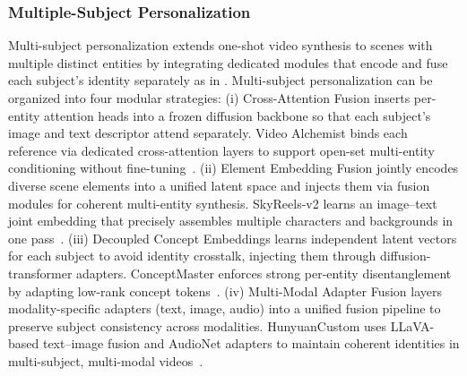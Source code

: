 \subsubsection{Multiple-Subject Personalization}
\label{sec:arch-one-multi}
Multi-subject personalization extends one-shot video synthesis to scenes with multiple distinct entities by integrating dedicated modules that encode and fuse each subject’s identity separately as in \cite{chen2025videoalchemist, chen2025skyreelsv2, huang2025conceptmaster, hu2025hunyuancustom}. Multi-subject personalization can be organized into four modular strategies: (i) Cross-Attention Fusion inserts per-entity attention heads into a frozen diffusion backbone so that each subject’s image and text descriptor attend separately. Video Alchemist binds each reference via dedicated cross-attention layers to support open-set multi-entity conditioning without fine-tuning~\cite{chen2025videoalchemist}. (ii) Element Embedding Fusion jointly encodes diverse scene elements into a unified latent space and injects them via fusion modules for coherent multi-entity synthesis. SkyReels-v2 learns an image–text joint embedding that precisely assembles multiple characters and backgrounds in one pass~\cite{chen2025skyreelsv2}. (iii) Decoupled Concept Embeddings learns independent latent vectors for each subject to avoid identity crosstalk, injecting them through diffusion-transformer adapters. ConceptMaster enforces strong per-entity disentanglement by adapting low-rank concept tokens~\cite{huang2025conceptmaster}. (iv) Multi-Modal Adapter Fusion layers modality-specific adapters (text, image, audio) into a unified fusion pipeline to preserve subject consistency across modalities. HunyuanCustom uses LLaVA-based text–image fusion and AudioNet adapters to maintain coherent identities in multi-subject, multi-modal videos~\cite{hu2025hunyuancustom}.

